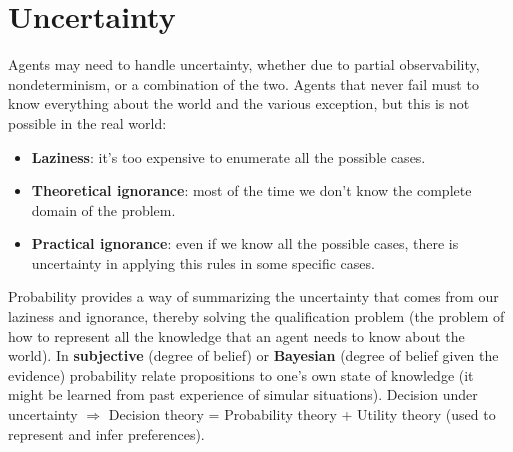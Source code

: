 \documentclass[12pt]{article}
\begin{document}
\section{Uncertainty}

Agents may need to handle uncertainty, whether due to partial observability, nondeterminism, or a combination of the two.
Agents that never fail must to know everything about the world and the various exception, but this is not possible in the real world:
\begin{itemize}
    \item \textbf{Laziness}: it's too expensive to enumerate all the possible cases.
    \item \textbf{Theoretical ignorance}: most of the time we don't know the complete domain of the problem.
    \item \textbf{Practical ignorance}: even if we know all the possible cases, there is uncertainty in applying this rules in some specific cases.
\end{itemize}
Probability provides a way of summarizing the uncertainty that comes from our laziness and ignorance,
thereby solving the qualification problem (the problem of how to represent all the knowledge that an agent needs to know about the world).
In \textbf{subjective} (degree of belief) or \textbf{Bayesian} (degree of belief given the evidence) probability relate propositions to 
one's own state of knowledge (it might be learned from past experience of simular situations).
Decision under uncertainty $\Rightarrow$ Decision theory = Probability theory + Utility theory (used to represent and infer preferences).
\end{document}

